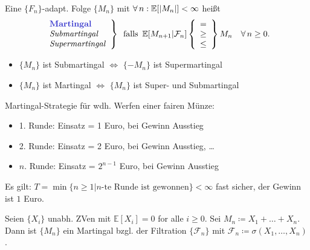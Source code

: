 \documentclass{cheat-sheet}
\newcommand{\E}{\mathbb{E}} %
\begin{document}
\begin{defn}
  Eine $\{ F_n \}$-adapt. Folge $\{ M_n \}$ mit $\fa{n\!}\! \E[\abs{M_n}] < \infty$ heißt
  \[
    \left. \begin{array}{l}
      \text{\emph{Martingal}}\\
      \text{\textit{Submartingal}}\\
      \text{\textit{Supermartingal}}\\
    \end{array} \right\}
    \enspace \text{falls} \enspace
    \E[M_{n+1} | \mathcal{F}_n]
    \left\{ \begin{array}{l}
      =\\
      \geq\\
      \leq
    \end{array} \right\}
    M_n
    \quad \forall\,n \geq 0.
  \]
\end{defn}

\begin{bem}
  \begin{itemize}
    \item $\{ M_n \}$ ist Submartingal $\iff$ $\{ -M_n \}$ ist Supermartingal
    \item $\{ M_n \}$ ist Martingal $\iff$ $\{ M_n \}$ ist Super- und Submartingal
  \end{itemize}
\end{bem}

\begin{bem}
  Martingal-Strategie für wdh. Werfen einer fairen Münze:
  \begin{itemize}
    \item 1. Runde: Einsatz = 1 Euro, bei Gewinn Ausstieg
    \item 2. Runde: Einsatz = 2 Euro, bei Gewinn Ausstieg, \ldots
    \item $n$. Runde: Einsatz = $2^{n-1}$ Euro, bei Gewinn Ausstieg
  \end{itemize}
  Es gilt: $T = \min \{ n \geq 1 | \text{$n$-te Runde ist gewonnen} \} < \infty$ fast sicher, der Gewinn ist $1$ Euro.
\end{bem}

\begin{bsp}
  Seien $\{ X_i \}$ unabh. ZVen mit $\E[X_i] = 0$ for alle $i \geq 0$.
  Sei $M_n \coloneqq X_1 + \ldots + X_n$.
  Dann ist $\{ M_n \}$ ein Martingal bzgl. der Filtration $\{ \mathcal{F}_n \}$ mit $\mathcal{F}_n \coloneqq \sigma(X_1, \ldots, X_n)$.
\end{bsp}
\end{document}

